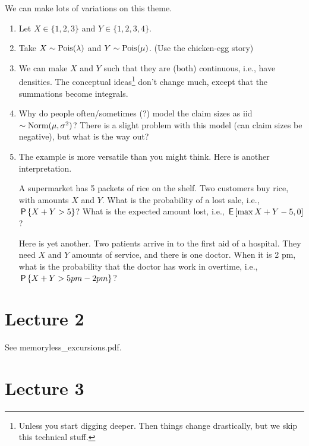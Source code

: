 \begin{remark}
We can  make lots of variations on this theme.
\begin{enumerate}
\item Let $X\in \{1,2,3\}$ and $Y\in \{1,2,3,4\}$.
\item Take $X\sim\Pois{\lambda}$ and $Y\sim\Pois{\mu}$. (Use the chicken-egg story)
\item We can make $X$ and $Y$ such that they are (both) continuous, i.e., have densities.
  The conceptual ideas\footnote{Unless you start digging deeper.
    Then things change drastically, but we skip this technical stuff.}
  don't change much, except that the summations become integrals.
\item Why do people often/sometimes (?) model the claim sizes as iid $\sim\Norm{\mu, \sigma^{2}}$? There is a slight problem with this model (can claim sizes be negative), but what is the way out?
\item The example is more versatile than you might think. Here is another interpretation.

A supermarket has 5 packets of rice on the shelf.
Two customers buy rice, with amounts $X$ and $Y$.
What is the probability of a lost sale, i.e., $\P{X+Y>5}$?
What is the expected amount lost, i.e., $\E{ \max{X+Y - 5,0}}$?

Here is yet another.
Two patients arrive in to the first aid of a hospital.
They need $X$ and $Y$ amounts of service, and there is one doctor.
When it is 2 pm, what is the probability that the doctor has work in overtime, i.e., $\P{X+Y > 5pm- 2pm}$?
\end{enumerate}
\end{remark}

\section{Lecture 2}

See memoryless\_excursions.pdf.

\section{Lecture 3}

